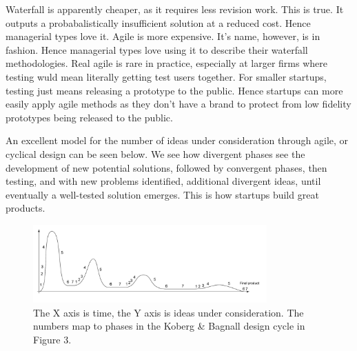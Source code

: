 \documentclass[12pt]{article}
\begin{document}
Waterfall is apparently cheaper, as it requires less revision work. This is true. It outputs a probabalistically insufficient solution at a reduced cost. Hence managerial types love it. Agile is more expensive. It's name, however, is in fashion. Hence managerial types love using it to describe their waterfall methodologies. Real agile is rare in practice, especially at larger firms where testing wuld mean literally getting test users together. For smaller startups, testing just means releasing a prototype to the public. Hence startups can more easily apply agile methods as they don't have a brand to protect from low fidelity prototypes being released to the public.

An excellent model for the number of ideas under consideration through agile, or cyclical design can be seen below. We see how divergent phases see the development of new potential solutions, followed by convergent phases, then testing, and with new problems identified, additional divergent ideas, until eventually a well-tested solution emerges. This is how startups build great products.

\begin{figure}[htbp]
  \centering
  \includegraphics[width=0.8\textwidth]{ideas.png}
  \caption{The X axis is time, the Y axis is ideas under consideration. The numbers map to phases in the Koberg \& Bagnall design cycle in Figure 3.}
\end{figure}
\end{document}
